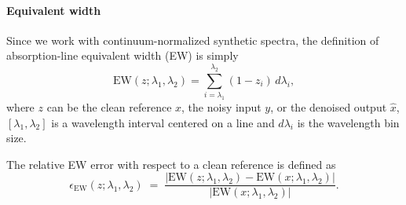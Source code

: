 \documentclass[twocolumn]{aastex7}
\begin{document}
\paragraph{Equivalent width} Since we work with continuum-normalized synthetic spectra, the definition of absorption-line equivalent width (EW) is simply
\begin{equation}
    \mathrm{EW}(z;\lambda_{1},\lambda_{2})
    =
    \sum_{i = \lambda_{1}}^{\lambda_{2}}\left( 1-z_i \right) \, d\lambda_i,
\end{equation}
where $z$ can be the clean reference $x$, the noisy input $y$, or the denoised output $\hat{x}$, $[\lambda_{1},\lambda_{2}]$ is a wavelength interval centered on a line and $d\lambda_i$ is the wavelength bin size.

The relative EW error with respect to a clean reference is defined as
\begin{equation}
    \epsilon_{\mathrm{EW}}(z;\lambda_{1},\lambda_{2})
    \;=\;
    \frac{\left| \mathrm{EW}(z;\lambda_{1},\lambda_{2})-\mathrm{EW}(x;\lambda_{1},\lambda_{2}) \right|}
         {\left| \mathrm{EW}(x;\lambda_{1},\lambda_{2}) \right|}.
    \label{eq:ew_relative_error}
\end{equation}
\end{document}

